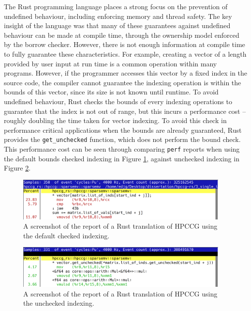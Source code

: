 The Rust programming language places a strong focus on the prevention of undefined behaviour, including enforcing memory and thread safety. The key insight of the language was that many of these guarantees against undefined behaviour can be made at compile time, through the ownership model enforced by the borrow checker. However, there is not enough information at compile time to fully guarantee these characteristics. For example, creating a vector of a length provided by user input at run time is a common operation within many programs. However, if the programmer accesses this vector by a fixed index in the source code, the compiler cannot guarantee the indexing operation is within the bounds of this vector, since its size is not known until runtime. To avoid undefined behaviour, Rust checks the bounds of every indexing operations to guarantee that the index is not out of range, but this incurs a performance cost -- roughly doubling the time taken for vector indexing. To avoid this check in performance critical applications when the bounds are already guaranteed, Rust provides the \texttt{get_unchecked} function, which does not perform the bound check. This performance cost can be seen through comparing \texttt{perf} reports when using the default bounds checked indexing in Figure \ref{fig:perf-checked}, against unchecked indexing in Figure \ref{fig:perf-unchecked}.

\begin{figure}[H]
    \centering
    \includegraphics[width=0.95\textwidth]{images/5_performance/perf_checked_op.png}
    \caption{A screenshot of the  report of a Rust translation of HPCCG using the default checked indexing.}
    \label{fig:perf-checked}
\end{figure}

\begin{figure}[H]
    \centering
    \includegraphics[width=0.95\textwidth]{images/5_performance/perf_unchecked_op.png}
    \caption{A screenshot of the  report of a Rust translation of HPCCG using the unchecked indexing.}
    \label{fig:perf-unchecked}
\end{figure}


